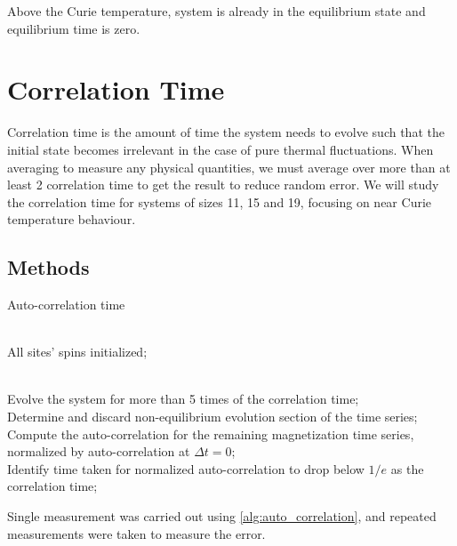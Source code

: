 \documentclass[%
showkeys,
bibnotes,
amsmath,amssymb,
floatfix,
]{revtex4-1}
\begin{document}
Above the Curie temperature, system is already in the equilibrium state and equilibrium time is zero.

\section{\label{sec:level1}Correlation Time}

Correlation time is the amount of time the system needs to evolve such that the initial state becomes irrelevant in the case of pure thermal fluctuations. When averaging to measure any physical quantities, we must average over more than at least 2 correlation time to get the result to reduce random error. We will study the correlation time for systems of sizes 11, 15 and 19, focusing on near Curie temperature behaviour.

\subsection{\label{sec:level2}Methods}
\begin{algorithm}[H]
	\caption{Auto-correlation time}
	\label{alg:auto_correlation}
	\begin{algorithmic}
		\REQUIRE ~~\\
		
		All sites' spins initialized;\\
		\label{code:auto_correlation:initialize}
		
		\ENSURE ~~\\
		
		Evolve the system for more than 5 times of the correlation time;\\
		\label{code:auto_correlation:evolve}
		Determine and discard non-equilibrium evolution section of the time series;\\
		\label{code:auto_correlation:discard_non_equi}
		Compute the auto-correlation for the remaining magnetization time series, normalized by auto-correlation at $\Delta t = 0$;\\
		\label{code:auto_correlation:normalized_auto_correlation}
		Identify time taken for normalized auto-correlation to drop below $1/e$ as the correlation time;\\
		\label{code:auto_correlation:below_1/e_time}
	\end{algorithmic}
\end{algorithm}

Single measurement was carried out using \ref{alg:auto_correlation}, and repeated measurements were taken to measure the error.
\end{document}
